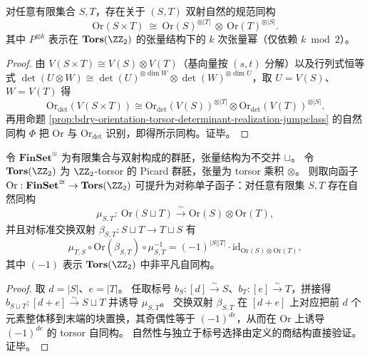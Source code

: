 \begin{proposition}\label{prop:bdry-orientation-cartesian-product-exponent-law}
对任意有限集合 \(S,T\)，存在关于 \((S,T)\) 双射自然的规范同构
\[
\mathrm{Or}(S\times T)\ \cong\ \mathrm{Or}(S)^{\otimes |T|}\ \otimes\ \mathrm{Or}(T)^{\otimes |S|}.
\]
其中 \(P^{\otimes k}\) 表示在 \(\mathbf{Tors}(\ZZ_2)\) 的张量结构下的 \(k\) 次张量幂（仅依赖 \(k\bmod 2\)）。
\end{proposition}
\begin{proof}
由 \(V(S\times T)\cong V(S)\otimes V(T)\)（基向量按 \((s,t)\) 分解）以及行列式恒等式
\(
\det(U\otimes W)\cong \det(U)^{\otimes \dim W}\otimes \det(W)^{\otimes \dim U}
\)，取 \(U=V(S)\)、\(W=V(T)\) 得
\[
\mathrm{Or}_{\det}(V(S\times T))
\cong
\mathrm{Or}_{\det}(V(S))^{\otimes |T|}\otimes \mathrm{Or}_{\det}(V(T))^{\otimes |S|}.
\]
再用命题 \ref{prop:bdry-orientation-torsor-determinant-realization-jumpclass} 的自然同构 \(\Phi\) 把 \(\mathrm{Or}\) 与 \(\mathrm{Or}_{\det}\) 识别，即得所示同构。证毕。
\end{proof}

\begin{proposition}\label{prop:bdry-orientation-functor-symmetric-monoidal-koszul}
令 \(\mathbf{FinSet}^{\cong}\) 为有限集合与双射构成的群胚，张量结构为不交并 \(\sqcup\)。
令 \(\mathbf{Tors}(\ZZ_2)\) 为 \(\ZZ_2\)-torsor 的 Picard 群胚，张量为 torsor 乘积 \(\otimes\)。
则取向函子 \(\mathrm{Or}:\mathbf{FinSet}^{\cong}\to \mathbf{Tors}(\ZZ_2)\) 可提升为对称单子函子：对任意有限集 \(S,T\) 存在自然同构
\[
\mu_{S,T}:\ \mathrm{Or}(S\sqcup T)\xrightarrow{\ \sim\ }\mathrm{Or}(S)\otimes\mathrm{Or}(T),
\]
并且对标准交换双射 \(\beta_{S,T}:S\sqcup T\to T\sqcup S\) 有
\[
\mu_{T,S}\circ \mathrm{Or}(\beta_{S,T})\circ \mu_{S,T}^{-1}
=(-1)^{|S||T|}\cdot\mathrm{id}_{\mathrm{Or}(S)\otimes \mathrm{Or}(T)},
\]
其中 \((-1)\) 表示 \(\mathbf{Tors}(\ZZ_2)\) 中非平凡自同构。
\end{proposition}
\begin{proof}
取 \(d=|S|\)、\(e=|T|\)。
任取标号 \(b_S:[d]\xrightarrow{\sim}S\)、\(b_T:[e]\xrightarrow{\sim}T\)，拼接得
\(
b_{S\sqcup T}:[d+e]\xrightarrow{\sim}S\sqcup T
\)
并诱导 \(\mu_{S,T}\)。
交换双射 \(\beta_{S,T}\) 在 \([d+e]\) 上对应把前 \(d\) 个元素整体移到末端的块置换，其奇偶性等于 \((-1)^{de}\)，从而在 \(\mathrm{Or}\) 上诱导 \((-1)^{de}\) 的 torsor 自同构。
自然性与独立于标号选择由定义的商结构直接验证。证毕。
\end{proof}

